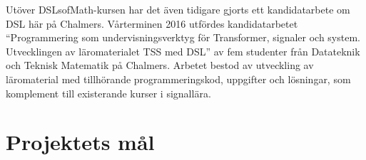 \begin{draft}
Utöver DSLsofMath-kursen har det även tidigare gjorts ett kandidatarbete om DSL 
här på Chalmers. Vårterminen 2016 utfördes kandidatarbetet
``Programmering som undervisningsverktyg för Transformer, signaler och
system. Utvecklingen av läromaterialet TSS med DSL'' av fem studenter
från Datateknik och Teknisk Matematik på Chalmers. Arbetet bestod av
utveckling av läromaterial med tillhörande programmeringskod,
uppgifter och lösningar, som komplement till existerande kurser i
signallära.\cite{kandidat2016}
\end{draft}

%

\section{Projektets mål}

